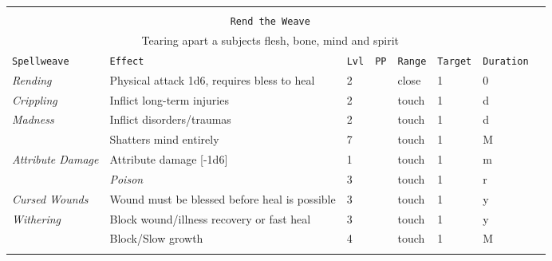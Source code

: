 \documentclass[10pt,a4paper]{article}
\begin{document}
\begin{table}[htbp!]
\begin{tabular}{llllllll}
			&&&&&&\\

    
     \multicolumn{7}{c}{\texttt{Rend the Weave}}\\
     \multicolumn{7}{c}{Tearing apart a subjects flesh, bone, mind and spirit}\\
    \hline
    \texttt{Spellweave} & \texttt{Effect} & \texttt{Lvl} & \texttt{PP} & \texttt{Range} & \texttt{Target} & \texttt{Duration} \\
    \hline
    \multirow{1}{*}{\textit{Rending}} & Physical attack 1d6, requires bless to heal & 2 && close & 1 & 0 \\	
     \hline
    \multirow{1}{*}{\textit{Crippling}} & Inflict long-term injuries & 2 && touch & 1 & d \\
     \hline
    \multirow{1}{*}{\textit{Madness}} & Inflict disorders/traumas & 2 && touch & 1 & d \\
    									& Shatters mind entirely & 7 && touch & 1 & M \\
    									
    	\hline
    \multirow{1}{*}{\textit{Attribute Damage}} & Attribute damage [-1d6] & 1 && touch & 1 & m \\
    											& \textit{Poison} & 3 && touch & 1 & r \\
    	\hline
    \multirow{1}{*}{\textit{Cursed Wounds}} & Wound must be blessed before heal is possible & 3 && touch & 1 & y \\
    \hline
    \multirow{1}{*}{\textit{Withering}} & Block wound/illness recovery or fast heal & 3 && touch & 1 & y \\
    									   & Block/Slow growth & 4 && touch & 1 & M \\
    	&&&&&&\\
    	
    	
    	

\end{tabular}
\end{table}
\end{document}
